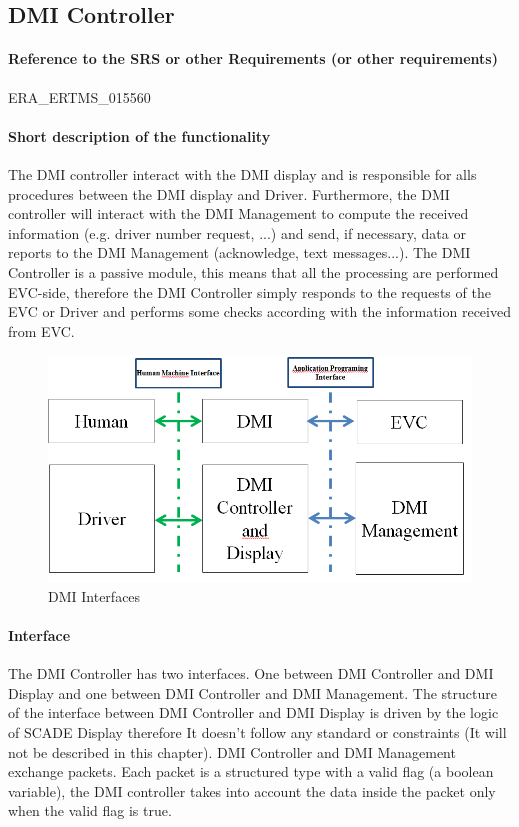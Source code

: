   \subsection{DMI Controller}

  \paragraph{Reference to the SRS or other Requirements (or other requirements)}

   ERA\_ERTMS\_015560

  \paragraph{Short description of the functionality}
  The DMI controller interact with the DMI display and is responsible for alls procedures between the DMI display and Driver. Furthermore, the DMI controller will interact with the DMI Management to compute the received information (e.g. driver number request, ...) and send, if necessary, data or reports to the DMI Management (acknowledge, text messages...). The DMI Controller is a passive module, this means that all the processing are performed EVC-side, therefore the DMI Controller simply responds to the requests of the EVC or Driver and performs some checks according with the information received from EVC.

  \begin{figure}
  \centering
  \includegraphics[width=.8\textwidth]{images/DMI_Interfaces}
  \caption{DMI Interfaces}
  \end{figure}

  \paragraph{Interface}
  The DMI Controller has two interfaces. One between DMI Controller and DMI Display and one between DMI Controller and DMI Management. 
  The structure of the interface between DMI Controller and DMI Display is driven by the logic of SCADE Display therefore It doesn't follow any standard or constraints (It will not be described in this chapter).
  DMI Controller and DMI Management exchange packets. Each packet is a structured type with a valid flag (a boolean variable), the DMI controller takes into account the data inside the packet only when the valid flag is true.

